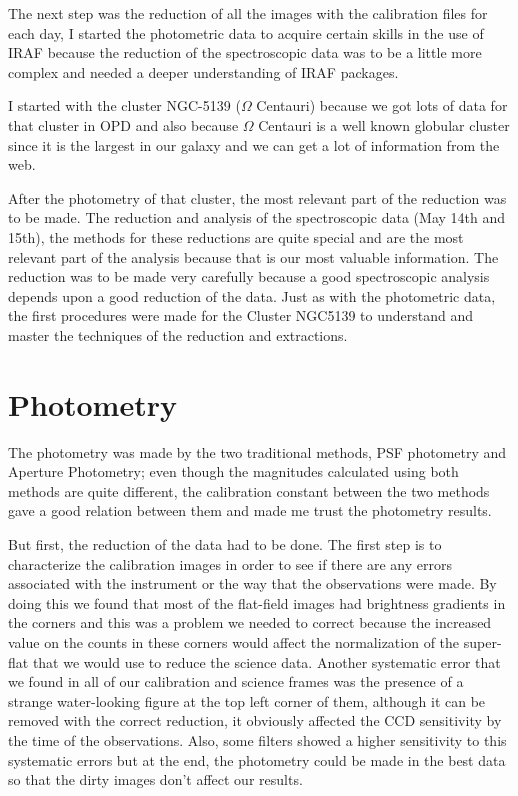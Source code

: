 The next step was the reduction of all the images with the calibration files for each day, I started the photometric data to acquire certain skills in the use of IRAF because the reduction of the spectroscopic data was to be a little more complex and needed a deeper understanding of IRAF packages. 

I started with the cluster NGC-5139 ($ \Omega $ Centauri) because we got lots of data for that cluster in OPD and also because $ \Omega $ Centauri is a well known globular cluster since it is the largest in our galaxy and we can get a lot of information from the web. 

After the photometry of that cluster, the most relevant part of the reduction was to be made. The reduction and analysis of the spectroscopic data (May 14th and 15th), the methods for these reductions are quite special and are the most relevant part of the analysis because that is our most valuable information. The reduction was to be made very carefully because a good spectroscopic analysis depends upon a good reduction of the data. Just as with the photometric data, the first procedures were made for the Cluster NGC5139 to understand and master the techniques of the reduction and extractions.

\section{Photometry}

The photometry was made by the two traditional methods, PSF photometry and Aperture Photometry; even though the magnitudes calculated using both methods are quite different, the calibration constant between the two methods gave a good relation between them and made me trust the photometry results.

But first, the reduction of the data had to be done. The first step is to characterize the calibration images in order to see if there are any errors associated with the instrument or the way that the observations were made. By doing this we found that most of the flat-field images had brightness gradients in the corners and this was a problem we needed to correct because the increased value on the counts in these corners would affect the normalization of the super-flat that we would use to reduce the science data. Another systematic error that we found in all of our calibration and science frames was the presence of a strange water-looking figure at the top left corner of them, although it can be removed with the correct reduction, it obviously affected the CCD sensitivity by the time of the observations. Also, some filters showed a higher sensitivity to this systematic errors but at the end, the photometry could be made in the best data so that the dirty images don't affect our results.

